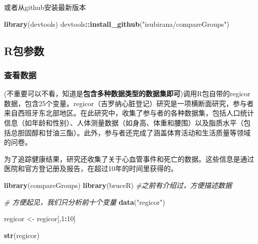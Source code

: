 \documentclass[
]{article}
\newenvironment{Shaded}{\begin{snugshade}}{\end{snugshade}}
\newcommand{\CommentTok}[1]{\textcolor[rgb]{0.56,0.35,0.01}{\textit{#1}}}
\newcommand{\DecValTok}[1]{\textcolor[rgb]{0.00,0.00,0.81}{#1}}
\newcommand{\FunctionTok}[1]{\textcolor[rgb]{0.13,0.29,0.53}{\textbf{#1}}}
\newcommand{\NormalTok}[1]{#1}
\newcommand{\OtherTok}[1]{\textcolor[rgb]{0.56,0.35,0.01}{#1}}
\newcommand{\SpecialCharTok}[1]{\textcolor[rgb]{0.81,0.36,0.00}{\textbf{#1}}}
\newcommand{\StringTok}[1]{\textcolor[rgb]{0.31,0.60,0.02}{#1}}
\begin{document}
或者从github安装最新版本

\begin{Shaded}
\begin{Highlighting}[]
\FunctionTok{library}\NormalTok{(devtools) }
\NormalTok{devtools}\SpecialCharTok{::}\FunctionTok{install\_github}\NormalTok{(}\StringTok{"isubirana/compareGroups"}\NormalTok{)}
\end{Highlighting}
\end{Shaded}

\subsection{R包参数}\label{rux5305ux53c2ux6570}

\subsubsection{\texorpdfstring{\textbf{查看数据}}{查看数据}}\label{ux67e5ux770bux6570ux636e}

(不重要可以不看，知道是\textbf{包含多种数据类型的数据集即可})调用R包自带的regicor数据，包含25个变量。regicor（吉罗纳心脏登记）研究是一项横断面研究，参与者来自西班牙东北部地区。在此研究中，收集了参与者的各种数据集，包括人口统计信息（如年龄和性别）、人体测量数据（如身高、体重和腰围）以及脂质水平（包括总胆固醇和甘油三酯）。此外，参与者还完成了涵盖体育活动和生活质量等领域的问卷。

为了追踪健康结果，研究还收集了关于心血管事件和死亡的数据。这些信息是通过医院和官方登记册及报告，在超过10年的时间里获得的。

\begin{Shaded}
\begin{Highlighting}[]
\FunctionTok{library}\NormalTok{(compareGroups)}
\FunctionTok{library}\NormalTok{(bruceR) }\CommentTok{\#之前有介绍过，方便描述数据}
\end{Highlighting}
\end{Shaded}

\begin{Shaded}
\begin{Highlighting}[]
\CommentTok{\# 方便起见，我们只分析前十个变量}
\FunctionTok{data}\NormalTok{(}\StringTok{"regicor"}\NormalTok{)}

\NormalTok{regicor }\OtherTok{\textless{}{-}}\NormalTok{ regicor[,}\DecValTok{1}\SpecialCharTok{:}\DecValTok{10}\NormalTok{]}

\FunctionTok{str}\NormalTok{(regicor)}
\end{Highlighting}
\end{Shaded}
\end{document}
